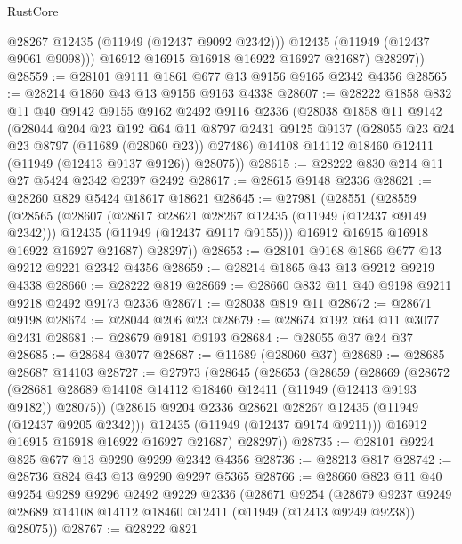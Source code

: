 \begin{lexlean}{RustCore}
\begin{coremodule}
              @28267
              @12435
              (@11949 (@12437 @9092 @2342)))
            @12435
            (@11949 (@12437 @9061 @9098)))
          @16912
          @16915
          @16918
          @16922
          @16927
          @21687)
        @28297))
@28559 := @28101 @9111 @1861 @677 @13 @9156 @9165 @2342 @4356
@28565 := @28214 @1860 @43 @13 @9156 @9163 @4338
@28607 := @28222
    @1858
    @832
    @11
    @40
    @9142
    @9155
    @9162
    @2492
    @9116
    @2336
    (@28038
      @1858
      @11
      @9142
      (@28044
        @204
        @23
        @192
        @64
        @11
        @8797
        @2431
        @9125
        @9137
        (@28055 @23 @24 @23 @8797 (@11689 (@28060 @23)) @27486)
        @14108
        @14112
        @18460
        @12411
        (@11949 (@12413 @9137 @9126))
        @28075))
@28615 := @28222 @830 @214 @11 @27 @5424 @2342 @2397 @2492
@28617 := @28615 @9148 @2336
@28621 := @28260 @829 @5424 @18617 @18621
@28645 := @27981
    (@28551
      (@28559
        (@28565
          (@28607
            (@28617 @28621 @28267 @12435 (@11949 (@12437 @9149 @2342)))
            @12435
            (@11949 (@12437 @9117 @9155)))
          @16912
          @16915
          @16918
          @16922
          @16927
          @21687)
        @28297))
@28653 := @28101 @9168 @1866 @677 @13 @9212 @9221 @2342 @4356
@28659 := @28214 @1865 @43 @13 @9212 @9219 @4338
@28660 := @28222 @819
@28669 := @28660 @832 @11 @40 @9198 @9211 @9218 @2492 @9173 @2336
@28671 := @28038 @819 @11
@28672 := @28671 @9198
@28674 := @28044 @206 @23
@28679 := @28674 @192 @64 @11 @3077 @2431
@28681 := @28679 @9181 @9193
@28684 := @28055 @37 @24 @37
@28685 := @28684 @3077
@28687 := @11689 (@28060 @37)
@28689 := @28685 @28687 @14103
@28727 := @27973
    (@28645
      (@28653
        (@28659
          (@28669
            (@28672
              (@28681 @28689 @14108 @14112 @18460 @12411 (@11949 (@12413 @9193 @9182)) @28075))
            (@28615 @9204 @2336 @28621 @28267 @12435 (@11949 (@12437 @9205 @2342)))
            @12435
            (@11949 (@12437 @9174 @9211)))
          @16912
          @16915
          @16918
          @16922
          @16927
          @21687)
        @28297))
@28735 := @28101 @9224 @825 @677 @13 @9290 @9299 @2342 @4356
@28736 := @28213 @817
@28742 := @28736 @824 @43 @13 @9290 @9297 @5365
@28766 := @28660
    @823
    @11
    @40
    @9254
    @9289
    @9296
    @2492
    @9229
    @2336
    (@28671
      @9254
      (@28679 @9237 @9249 @28689 @14108 @14112 @18460 @12411 (@11949 (@12413 @9249 @9238)) @28075))
@28767 := @28222 @821

\end{coremodule}
\end{lexlean}
